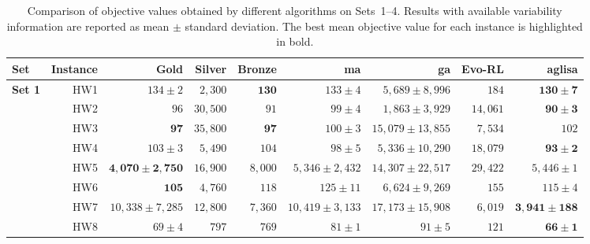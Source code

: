 \documentclass[pdflatex]{sn-jnl}
\begin{document}
\begin{table}
\centering
\caption{Comparison of objective values obtained by different algorithms on Sets~1--4.
Results with available variability information are reported as mean $\pm$ standard deviation.
The best mean objective value for each instance is highlighted in bold.}
\label{tab:results_set1_4}

\setlength{\tabcolsep}{2.5pt}
\scriptsize

\begin{tabular}{l|r|r|r|r|r|r|r|r}
\hline
\textbf{Set}
& \textbf{Instance}
& \textbf{Gold}
& \textbf{Silver}
& \textbf{Bronze}
& \textbf{\gls{ma}}
& \textbf{\gls{ga}}
& \textbf{Evo-RL}
& \textbf{\gls{aglisa}} \\
\hline

\multirow{8}{*}{\textbf{Set 1}}
& HW1 & $134 \pm 2$ & $2,300$ & $\mathbf{130}$ & $133 \pm 4$ & $5,689 \pm 8,996$ & $184$ & $\mathbf{130 \pm 7}$ \\
& HW2 & $96$ & $30,500$ & $91$ & $99 \pm 4$ & $1,863 \pm 3,929$ & $14,061$ & $\mathbf{90 \pm 3}$ \\
& HW3 & $\mathbf{97}$ & $35,800$ & $\mathbf{97}$ & $100 \pm 3$ & $15,079 \pm 13,855$ & $7,534$ & $102$ \\
& HW4 & $103 \pm 3$ & $5,490$ & $104$ & $98 \pm 5$ & $5,336 \pm 10,290$ & $18,079$ & $\mathbf{93 \pm 2}$ \\
& HW5 & $\mathbf{4,070 \pm 2,750}$ & $16,900$ & $8,000$ & $5,346 \pm 2,432$ & $14,307 \pm 22,517$ & $29,422$ & $5,446 \pm 1$ \\
& HW6 & $\mathbf{105}$ & $4,760$ & $118$ & $125 \pm 11$ & $6,624 \pm 9,269$ & $155$ & $115 \pm 4$ \\
& HW7 & $10,338 \pm 7,285$ & $12,800$ & $7,360$ & $10,419 \pm 3,133$ & $17,173 \pm 15,908$ & $6,019$ & $\mathbf{3,941 \pm 188}$ \\
& HW8 & $69 \pm 4$ & $797$ & $769$ & $81 \pm 1$ & $91 \pm 5$ & $121$ & $\mathbf{66 \pm 1}$ \\
\hline


\end{tabular}
\end{table}
\end{document}
